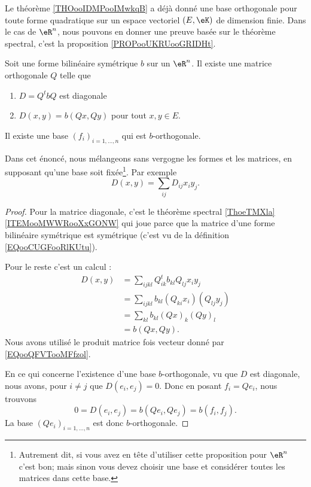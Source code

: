 Le théorème \ref{THOooIDMPooIMwkqB} a déjà donné une base orthogonale pour toute forme quadratique sur un espace vectoriel \( (E,\eK)\) de dimension finie. Dans le cas de \( \eR^n\), nous pouvons en donner une preuve basée sur le théorème spectral, c'est la proposition \ref{PROPooUKRUooGRIDHt}.

\begin{proposition}     \label{PROPooUKRUooGRIDHt}
    Soit une forme bilinéaire symétrique \( b\) sur un \( \eR^n\). Il existe une matrice orthogonale \( Q\) telle que 
    \begin{enumerate}
        \item
            \( D=Q^tbQ\) est diagonale
        \item
            \( D(x,y)=b(Qx,Qy)\) pour tout \( x,y\in E\).
    \end{enumerate}

    Il existe une base \( (f_i)_{i=1,\ldots, n}\) qui est \( b\)-orthogonale.

    Dans cet énoncé, nous mélangeons sans vergogne les formes et les matrices, en supposant qu'une base soit fixée\footnote{Autrement dit, si vous avez en tête d'utiliser cette proposition pour \( \eR^n\) c'est bon; mais sinon vous devez choisir une base et considérer toutes les matrices dans cette base.}. Par exemple
    \begin{equation}
        D(x,y)=\sum_{ij}D_{ij}x_iy_j.
    \end{equation}
\end{proposition}

\begin{proof}
    Pour la matrice diagonale, c'est le théorème spectral \ref{ThoeTMXla}\ref{ITEMooMWWRooXxGONW} qui joue parce que la matrice d'une forme bilinéaire symétrique est symétrique (c'est vu de la définition \eqref{EQooCUGFooRlKUtu}).

    Pour le reste c'est un calcul :
    \begin{subequations}
        \begin{align}
            D(x,y)&=\sum_{ijkl}Q^t_{ik}b_{kl}Q_{lj}x_iy_j\\
            &=\sum_{ijkl}b_{kl}(Q_{ki}x_i)(Q_{lj}y_j)\\
            &=\sum_{kl}b_{kl}(Qx)_k(Qy)_l\\
            &=b(Qx,Qy).
        \end{align}
    \end{subequations}
    Nous avons utilisé le produit matrice fois vecteur donné par \eqref{EQooQFVTooMFfzol}.

    En ce qui concerne l'existence d'une base \( b\)-orthogonale, vu que \( D\) est diagonale, nous avons, pour \( i\neq j\) que \( D(e_i,e_j)=0\). Donc en posant \( f_i=Qe_i\), nous trouvons
    \begin{equation}
        0=D(e_i,e_j)=b(Qe_i,Qe_j)=b(f_i,f_j).
    \end{equation}
    La base \( (Qe_i)_{i=1,\ldots, n}\) est donc \( b\)-orthogonale.
\end{proof}
